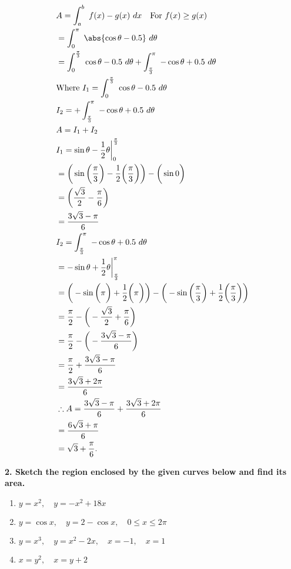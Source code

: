 \documentclass{report}
\begin{document}
    \begin{minipage}[]{0.47\textwidth}
     \begin{align*}
        &A = \int_{a}^{b}\ f(x) - g(x)\ dx \quad \text{For $f(x) \geq g(x)$} \\
        &= \int_{0}^{\pi}\ \abs{\cos{\theta } - 0.5} \ d\theta  \\
        &= \int_{0}^{\frac{\pi}{3}}\ \cos{\theta } - 0.5\ d\theta  + \int_{\frac{\pi}{3}}^{\pi}\ -\cos{\theta } + 0.5\ d\theta  \\
        &\text{Where}\ I_{1} = \int_{0}^{\frac{\pi}{3}}\ \cos{\theta } - 0.5\ d\theta  \\
        &I_{2} = + \int_{\frac{\pi}{3}}^{\pi}\ -\cos{\theta } + 0.5\ d\theta  \\
        &A = I_{1} + I_{2} \\
        &I_{1} = \sin{\theta } -\frac{1}{2}\theta \bigg|^{\frac{\pi}{3}}_{0} \\
        &= \bigg(\sin{\bigg(\frac{\pi}{3}\bigg)} - \frac{1}{2}\bigg(\frac{\pi}{3}\bigg)\bigg)  - \bigg(\sin{0}\bigg) \\
        &= \bigg(\frac{\sqrt{3}}{2} - \frac{\pi}{6}\bigg)  \\
        &= \frac{3\sqrt{3} - \pi}{6} \\
        &I_{2} = \int_{\frac{\pi}{3}}^{\pi}\ -\cos{\theta } + 0.5\ d\theta  \\
        &= -\sin{\theta} + \frac{1}{2}\theta \bigg|_{\frac{\pi}{3}}^{\pi} \\
        &= \bigg(-\sin{\bigg(\pi\bigg)} + \frac{1}{2}\bigg(\pi\bigg)\bigg) - \bigg(-\sin{\bigg(\frac{\pi}{3}\bigg) + \frac{1}{2}\bigg(\frac{\pi}{3}\bigg)}\bigg) \\
        &= \frac{\pi}{2} - \bigg(-\frac{\sqrt{3}}{2}+\frac{\pi}{6}\bigg)  \\
        &= \frac{\pi}{2} - \bigg(-\frac{3\sqrt{3}-\pi}{6}\bigg) \\
        &= \frac{\pi}{2} + \frac{3\sqrt{3}-\pi}{6}\\
        &=\frac{3\sqrt{3}+2\pi}{6} \\
        &\therefore A = \frac{3\sqrt{3} -\pi}{6} +  \frac{3\sqrt{3}+2\pi}{6}\\
        &=\frac{6\sqrt{3}+\pi}{6} \\
        &=\sqrt{3}+\frac{\pi}{6}
    .\end{align*}
    \end{minipage}

    \pagebreak 
    \begin{mdframed}
        \textbf{2. Sketch the region enclosed by the given curves below and find its area.}
        \begin{enumerate}[label=(\alph*)]
            \item \( y = x^2, \quad y = -x^2 + 18x \)
            \item \( y = \cos x, \quad y = 2 - \cos x, \quad 0 \leq x \leq 2\pi \)
            \item \( y = x^3, \quad y = x^2 - 2x, \quad x = -1, \quad x = 1 \)
            \item \( x = y^2, \quad x = y + 2 \)
        \end{enumerate}
    \end{mdframed}
\end{document}
